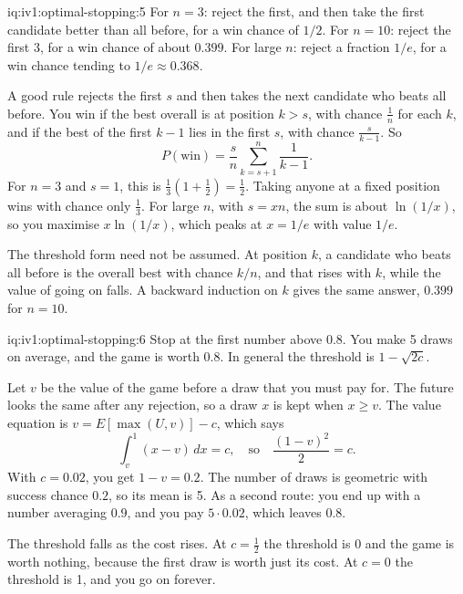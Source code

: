 \begin{solution}{iq:iv1:optimal-stopping:5}
For $n = 3$: reject the first, and then take the first candidate better than all before, for a win chance of $1/2$. For $n = 10$: reject the first 3, for a win chance of about $0.399$. For large $n$: reject a fraction $1/e$, for a win chance tending to $1/e \approx 0.368$.

A good rule rejects the first $s$ and then takes the next candidate who beats all before. You win if the best overall is at position $k > s$, with chance $\tfrac1n$ for each $k$, and if the best of the first $k - 1$ lies in the first $s$, with chance $\tfrac{s}{k - 1}$. So
\[
P(\text{win}) = \frac{s}{n} \sum_{k = s + 1}^{n} \frac{1}{k - 1}.
\]
For $n = 3$ and $s = 1$, this is $\tfrac13(1 + \tfrac12) = \tfrac12$. Taking anyone at a fixed position wins with chance only $\tfrac13$. For large $n$, with $s = xn$, the sum is about $\ln(1/x)$, so you maximise $x\ln(1/x)$, which peaks at $x = 1/e$ with value $1/e$.

The threshold form need not be assumed. At position $k$, a candidate who beats all before is the overall best with chance $k/n$, and that rises with $k$, while the value of going on falls. A backward induction on $k$ gives the same answer, $0.399$ for $n = 10$.

\end{solution}

\begin{solution}{iq:iv1:optimal-stopping:6}
Stop at the first number above $0.8$. You make 5 draws on average, and the game is worth $0.8$. In general the threshold is $1 - \sqrt{2c}$.

Let $v$ be the value of the game before a draw that you must pay for. The future looks the same after any rejection, so a draw $x$ is kept when $x \ge v$. The value equation is $v = E[\max(U, v)] - c$, which says
\[
\int_v^1 (x - v)\,dx = c, \quad\text{so}\quad \frac{(1 - v)^2}{2} = c.
\]
With $c = 0.02$, you get $1 - v = 0.2$. The number of draws is geometric with success chance $0.2$, so its mean is 5. As a second route: you end up with a number averaging $0.9$, and you pay $5 \cdot 0.02$, which leaves $0.8$.

The threshold falls as the cost rises. At $c = \tfrac12$ the threshold is 0 and the game is worth nothing, because the first draw is worth just its cost. At $c = 0$ the threshold is 1, and you go on forever.

\end{solution}

